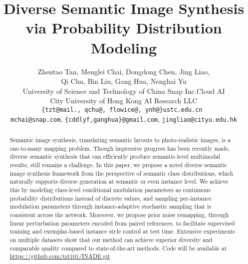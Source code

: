 \documentclass[final]{cvpr}
\begin{document}
\title{Diverse Semantic Image Synthesis via Probability Distribution Modeling}

\author{Zhentao Tan, Menglei Chai, Dongdong Chen, Jing Liao, \\ Qi Chu, Bin Liu, Gang Hua, Nenghai Yu\\
University of Science and Technology of China \quad 
Snap Inc.\quadMicrosoft Cloud AI\\
City University of Hong Kong
\quadWormpex AI Research LLC\\
{\tt\small\{tzt@mail., qchu@, flowice@, ynh@\}ustc.edu.cn }\\
{\tt\small mchai@snap.com}, 
{\tt\small \{cddlyf,ganghua\}@gmail.com},
{\tt\small jingliao@cityu.edu.hk}
}

\maketitle


\begin{abstract}
Semantic image synthesis, translating semantic layouts to photo-realistic images, is a one-to-many mapping problem.
Though impressive progress has been recently made, diverse semantic synthesis that can efficiently produce semantic-level multimodal results, still remains a challenge.
In this paper, we propose a novel diverse semantic image synthesis framework from the perspective of semantic class distributions, which naturally supports diverse generation at semantic or even instance level. We achieve this by modeling class-level conditional modulation parameters as continuous probability distributions instead of discrete values, and sampling per-instance modulation parameters through instance-adaptive stochastic sampling that is consistent across the network. Moreover, we propose prior noise remapping, through linear perturbation parameters encoded from paired references, to facilitate supervised training and exemplar-based instance style control at test time. Extensive experiments on multiple datasets show that our method can achieve superior diversity and comparable quality compared to state-of-the-art methods. Code will be available at \url{https://github.com/tzt101/INADE.git}
\end{abstract}
\end{document}
